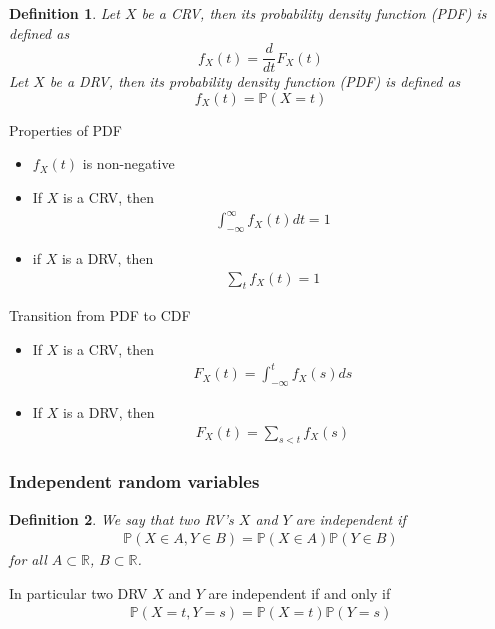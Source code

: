 \documentclass[10pt]{article}
\newtheorem*{definition}{Definition}
\begin{document}
\begin{definition}
    Let $X$ be a CRV, then its probability density function (PDF) is defined as
    $$
        f_X(t)=\frac{d}{dt}F_X(t)
    $$
    Let $X$ be a DRV, then its probability density function (PDF) is defined as
    $$
        f_X(t)=\mathbb{P}(X=t)
    $$
\end{definition}

Properties of PDF
\begin{itemize}
    \item $f_X(t)$ is non-negative
    \item If $X$ is a CRV, then
          \begin{align}
              \int_{-\infty}^\infty f_X(t)dt=1
          \end{align}
    \item if $X$ is a DRV, then
          \begin{align}
              \sum_{t} f_X(t)=1
          \end{align}
\end{itemize}

Transition from PDF to CDF
\begin{itemize}
    \item If $X$ is a CRV, then
          \begin{align}
              F_X(t)=\int_{-\infty}^t f_X(s)ds
          \end{align}
    \item If $X$ is a DRV, then
          \begin{align}
              F_X(t)=\sum_{s<t}f_X(s)
          \end{align}
\end{itemize}

\subsubsection{Independent random variables}

\begin{definition} We say that two RV's $X$ and $Y$ are independent if
    \begin{align}
        \mathbb{P}(X\in A, Y\in B)=\mathbb{P}(X\in A)\mathbb{P}(Y\in B)
    \end{align}
    for all $A\subset\mathbb{R}$, $B\subset\mathbb{R}$.
\end{definition}

In particular two DRV $X$ and $Y$ are independent if and only if
\begin{align}
    \mathbb{P}(X=t, Y=s)=\mathbb{P}(X=t)\mathbb{P}(Y=s)
\end{align}
\end{document}
